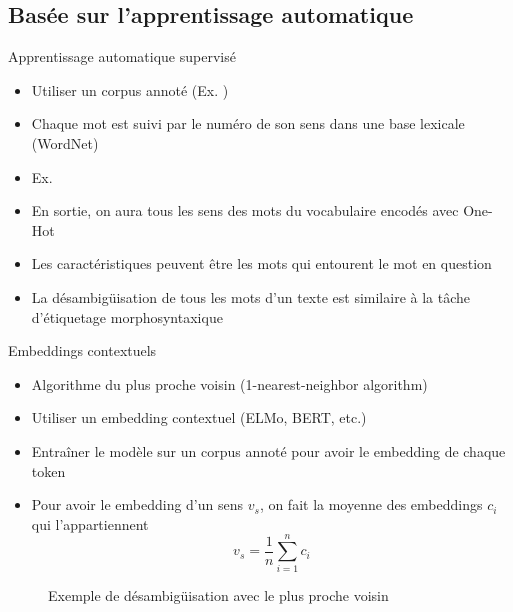 \documentclass{KodeBook}
\begin{document}
\subsection{Basée sur l'apprentissage automatique}

Apprentissage automatique supervisé

\begin{itemize}
	\item Utiliser un corpus annoté (Ex. )
	\item Chaque mot est suivi par le numéro de son sens dans une base lexicale (WordNet)
	\item Ex. 
	\item En sortie, on aura tous les sens des mots du vocabulaire encodés avec One-Hot
	\item Les caractéristiques peuvent être les mots qui entourent le mot en question
	\item La désambigüisation de tous les mots d'un texte est similaire à la tâche d'étiquetage morphosyntaxique
\end{itemize}

Embeddings contextuels

\begin{minipage}{.68\textwidth}
	\begin{itemize}
		\item Algorithme du plus proche voisin (1-nearest-neighbor algorithm) 
		\item Utiliser un embedding contextuel (ELMo, BERT, etc.)
		\item Entraîner le modèle sur un corpus annoté pour avoir le embedding de chaque token
		\item Pour avoir le embedding d'un sens $v_s$, on fait la moyenne des embeddings $c_i$ qui l'appartiennent
		\[ v_s = \frac{1}{n} \sum_{i=1}^{n} c_i \] 
	\end{itemize}
\end{minipage}
\begin{figure}
	\caption{Exemple de désambigüisation avec le plus proche voisin \cite{2019-jurafsky-martin}}
\end{figure}


\begin{discussion}



\end{discussion}

\ifx\wholebook\relax\else
% 
% 
	
\end{document}
